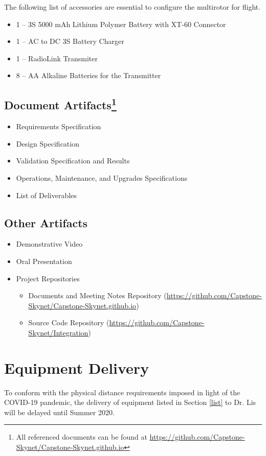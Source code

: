 \documentclass[10pt,letterpaper]{article}
\begin{document}
The following list of accessories are essential to configure the multirotor for flight.

\begin{itemize}
\item 1 -- 3S 5000 mAh Lithium Polymer Battery with XT-60 Connector
\item 1 -- AC to DC 3S Battery Charger
\item 1 -- RadioLink Transmiter
\item 8 -- AA Alkaline Batteries for the Transmitter
\end{itemize}


\subsection[Document Artifacts]{Document Artifacts\footnote{All referenced documents can be found at \url{https://github.com/Capstone-Skynet/Capstone-Skynet.github.io}}}

\begin{itemize}
\item Requirements Specification
\item Design Specification
\item Validation Specification and Results
\item Operations, Maintenance, and Upgrades Specifications
\item List of Deliverables
\end{itemize}

\subsection{Other Artifacts}
\begin{itemize}
\item Demonstrative Video
\item Oral Presentation
\item Project Repositories
\begin{itemize}
    \item Documents and Meeting Notes Repository ({\url{https://github.com/Capstone-Skynet/Capstone-Skynet.github.io}})
    \item Source Code Repository ({\url{https://github.com/Capstone-Skynet/Integration}})
\end{itemize}
\end{itemize}

\section{Equipment Delivery}
To conform with the physical distance requirements imposed in light of the COVID-19 pandemic, the delivery of equipment listed in Section \ref{list} to Dr. Lis will be delayed until Summer 2020. 
\end{document}
